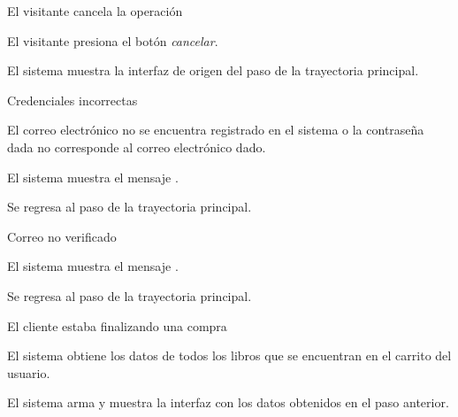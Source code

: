 {  %

  \begin{trayectoriaAlternativa}
    {El visitante cancela la operación}

    \item El visitante presiona el botón \textit{cancelar}.

    \item El sistema muestra la interfaz de origen del paso
       de la trayectoria principal.

  \end{trayectoriaAlternativa}


  \begin{trayectoriaAlternativa}
    {Credenciales incorrectas}

    \item El correo electrónico no se encuentra registrado en el sistema o la
      contraseña dada no corresponde al correo electrónico dado.

    \item El sistema muestra el mensaje
      .

    \item Se regresa al paso  de la trayectoria
      principal.

  \end{trayectoriaAlternativa}


  \begin{trayectoriaAlternativa}
    {Correo no verificado}

    \item El sistema muestra el mensaje
      .

    \item Se regresa al paso  de la trayectoria
      principal.

  \end{trayectoriaAlternativa}


  \begin{trayectoriaAlternativa}
    {El cliente estaba finalizando una compra}

    \item El sistema obtiene los datos de todos los libros que se encuentran en
      el carrito del usuario.

    \item El sistema arma y muestra la interfaz
       con los datos obtenidos en el paso
      anterior.

  \end{trayectoriaAlternativa}
}
